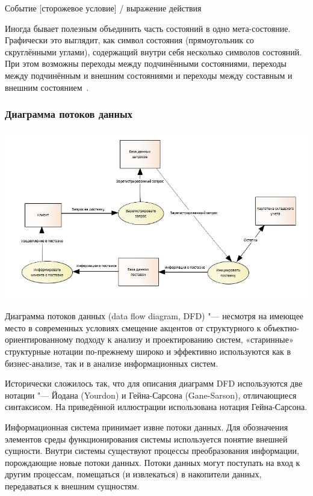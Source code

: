 \documentclass{../industrial-development}
\begin{document}
\alert{Событие [сторожевое условие] / выражение действия}

Иногда бывает полезным объединить часть состояний в одно мета-состояние. Графически это выглядит, как символ состояния (прямоугольник со скруглёнными углами), содержащий внутри себя несколько символов состояний. При этом возможны переходы между подчинёнными состояниями, переходы между подчинённым и внешним состояниями и переходы между составным и внешним состоянием~\cite[с.~48--49]{Maglinec}.


\begin{frame} \frametitle {Диаграмма потоков данных}
 \centerline{\includegraphics[width=1.1\textwidth]{dtdpic.jpg}}
\end{frame}

\lecturenotes

\alert{Диаграмма потоков данных} (data flow diagram, DFD) "--- несмотря на имеющее место в современных условиях смещение акцентов от структурного к объектно-ориентированному подходу к анализу и проектированию систем, «старинные» структурные нотации по-прежнему широко и эффективно используются как в бизнес-анализе, так и в анализе информационных систем.

Исторически сложилось так, что для описания диаграмм DFD используются две нотации "--- Йодана (Yourdon) и Гейна-Сарсона (Gane-Sarson), отличающиеся синтаксисом. На приведённой иллюстрации использована нотация Гейна-Сарсона.

Информационная система принимает извне потоки данных. Для обозначения элементов среды функционирования системы используется понятие внешней сущности. Внутри системы существуют процессы преобразования информации, порождающие новые потоки данных. Потоки данных могут поступать на вход к другим процессам, помещаться (и извлекаться) в накопители данных, передаваться к внешним сущностям.
\end{document}
